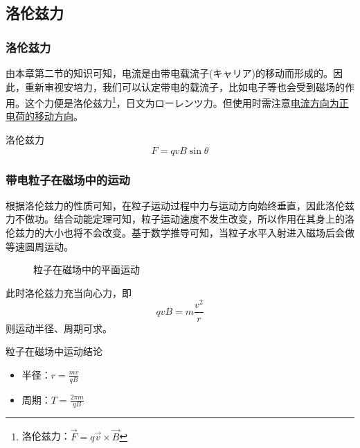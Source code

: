 \subsection{洛伦兹力}
\label{subsec:洛伦兹力}

\subsubsection{洛伦兹力}

由本章第二节的知识可知，电流是由带电载流子(キャリア)的移动而形成的。因此，重新审视安培力，我们可以认定带电的载流子，比如电子等也会受到磁场的作用。这个力便是洛伦兹力\footnote{洛伦兹力：$\vec{F}=q\vec{v}\times\vec{B}$}，日文为ローレンツ力。但使用时需注意\underline{电流方向为正电荷的移动方向}。
\begin{itembox}[l]{洛伦兹力}
    \begin{equation*}
        F=qvB\sin\theta
    \end{equation*}
\end{itembox}

\subsubsection{带电粒子在磁场中的运动}

根据洛伦兹力的性质可知，在粒子运动过程中力与运动方向始终垂直，因此洛伦兹力不做功。结合动能定理可知，粒子运动速度不发生改变，所以作用在其身上的洛伦兹力的大小也将不会改变。基于数学推导可知，当粒子水平入射进入磁场后会做等速圆周运动。
\begin{figure}[ht!]
    \centering
    \caption{粒子在磁场中的平面运动}
\end{figure}

此时洛伦兹力充当向心力，即
\begin{equation*}
    qvB=m\frac{v^2}{r}
\end{equation*}
则运动半径、周期可求。
\begin{itembox}[l]{粒子在磁场中运动结论}
    \begin{itemize}
        \item 半径：$r=\frac{mv}{qB}$
        \item 周期：$T=\frac{2\pi m}{qB}$
    \end{itemize}
\end{itembox}

